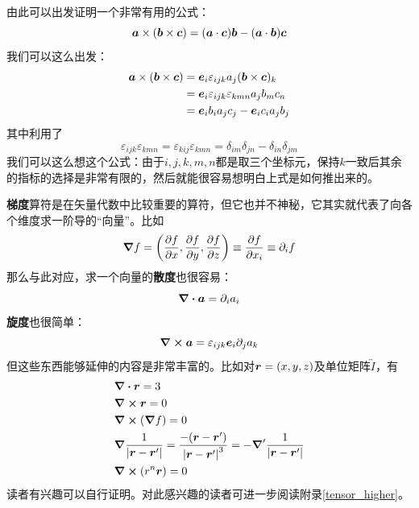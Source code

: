 \documentclass[12pt,a4paper,openany,twoside]{book}
\numberwithin{equation}{section}
\begin{document}
          由此可以出发证明一个非常有用的公式：
          \begin{equation}
            \vb*{a}\times (\vb*{b}\times \vb*{c}) = (\vb*{a} \cdot \vb*{c}) \vb*{b} - (\vb*{a} \cdot \vb*{b}) \vb*{c}
          \end{equation} 
          我们可以这么出发：
          \begin{align*}
            \vb*{a} \times (\vb*{b} \times \vb*{c}) &= \vb*{e}_i \varepsilon_{ijk} a_j (\vb*{b} \times \vb*{c})_k \\
            &= \vb*{e}_i \varepsilon_{ijk} \varepsilon_{kmn} a_j b_m c_n \\
            &= \vb*{e}_i b_i a_j c_j - \vb*{e}_i c_i a_j b_j
          \end{align*}
          其中利用了
          \begin{equation}
            \varepsilon_{ijk}\varepsilon_{kmn} = \varepsilon_{kij} \varepsilon_{kmn} = \delta_{im} \delta_{jn} - \delta_{in}\delta_{jm}
          \end{equation} 
          我们可以这么想这个公式：由于$i,j,k,m,n$都是取三个坐标元，保持$k$一致后其余的指标的选择是非常有限的，然后就能很容易想明白上式是如何推出来的。

          \textbf{梯度}算符是在矢量代数中比较重要的算符，但它也并不神秘，它其实就代表了向各个维度求一阶导的“向量”。比如
          \begin{equation*}
            \grad{f}=\qty(\pdv{f}{x},\pdv{f}{y},\pdv{f}{z})\equiv\pdv{f}{x_i}\equiv\partial_i f
          \end{equation*} 
          那么与此对应，求一个向量的\textbf{散度}也很容易：
          \begin{equation*}
            \div{\vb*{a}} = \partial_i a_i 
          \end{equation*} 
          \textbf{旋度}也很简单：
          \begin{equation*}
            \curl{\vb*{a}} = \varepsilon_{ijk} \vb*{e}_i \partial_j a_k
          \end{equation*} 
          但这些东西能够延伸的内容是非常丰富的。比如对$\vb*{r} = (x,y,z)$及单位矩阵$\overleftrightarrow{I}$，有
          \begin{align}
            &\div{\vb*{r}} = 3 \\
            &\curl{\vb*{r}} = 0 \\
            &\curl{(\grad{f})} = 0 \\
            &\grad{\frac{1}{\abs{\vb*{r}-\vb*{r}'}}} = \frac{-\qty(\vb*{r}-\vb*{r}')}{\abs{\vb*{r}-\vb*{r}'}^3} = - \grad'{\frac{1}{\abs{\vb*{r}-\vb*{r}'}}} \\
            &\curl{\qty(r^n \vb*{r})} = 0 
          \end{align}
          读者有兴趣可以自行证明。对此感兴趣的读者可进一步阅读附录\ref{tensor_higher}。\\
\end{document}
